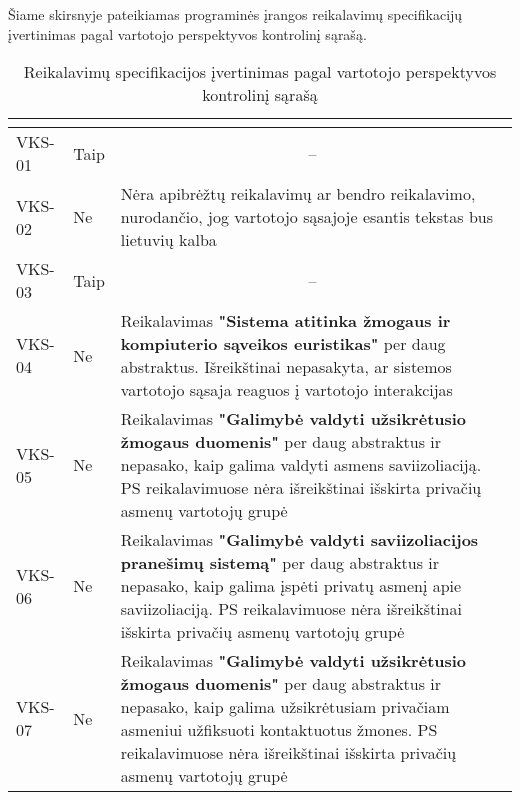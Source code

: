 \documentclass{VUMIFPSkursinis}
\begin{document}
Šiame skirsnyje pateikiamas programinės įrangos reikalavimų specifikacijų įvertinimas pagal vartotojo perspektyvos kontrolinį sąrašą.
			\begin{center}

\begin{longtable}{|C{2cm}|L{2.5cm}|L{10cm}|}

					\caption{Reikalavimų specifikacijos įvertinimas pagal vartotojo perspektyvos kontrolinį sąrašą}
					\label{table:VKS}

 					\\ \hline
 					 &
  					 & 
 					\\ \hline
 					VKS-01 &
 					Taip& 
 					\\ \hline
 					VKS-02 &
 					Ne&
 					Nėra apibrėžtų reikalavimų ar bendro reikalavimo, nurodančio, jog vartotojo sąsajoje esantis tekstas bus lietuvių kalba\\ \hline
 					VKS-03 &
 					Taip & 
					\\ \hline  
 					VKS-04 &
 					Ne& 
 					Reikalavimas \textbf{"Sistema atitinka žmogaus ir kompiuterio sąveikos euristikas"} per daug abstraktus. Išreikštinai nepasakyta, ar sistemos vartotojo sąsaja reaguos į vartotojo interakcijas \\ \hline    
 					VKS-05 &
 					Ne& 
 					Reikalavimas \textbf{"Galimybė valdyti užsikrėtusio žmogaus duomenis"} per daug abstraktus ir nepasako, kaip galima valdyti asmens saviizoliaciją. PS reikalavimuose nėra išreikštinai išskirta privačių asmenų vartotojų grupė\\ \hline  
 					VKS-06 &
 					Ne&
 					Reikalavimas \textbf{"Galimybė valdyti saviizoliacijos pranešimų sistemą"} per daug abstraktus ir nepasako, kaip galima įspėti privatų asmenį apie saviizoliaciją. PS reikalavimuose nėra išreikštinai išskirta privačių asmenų vartotojų grupė\\ \hline   					
 					VKS-07 &
 					Ne&
 					Reikalavimas \textbf{"Galimybė valdyti užsikrėtusio žmogaus duomenis"} per daug abstraktus ir nepasako, kaip galima užsikrėtusiam privačiam asmeniui užfiksuoti kontaktuotus žmones. PS reikalavimuose nėra išreikštinai išskirta privačių asmenų vartotojų grupė\\ \hline  

\end{longtable}
\end{center}
\end{document}
